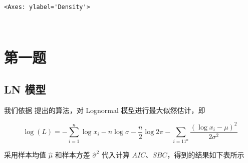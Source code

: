 \documentclass[11pt]{article}
\makeatletter
\newcommand{\boxspacing}{\kern\kvtcb@left@rule\kern\kvtcb@boxsep}
\newcommand{\prompt}[4]{
        {\ttfamily\llap{{\color{#2}[#3]:\hspace{3pt}#4}}\vspace{-\baselineskip}}
    }
\makeatother
\begin{document}
            \begin{tcolorbox}[breakable, size=fbox, boxrule=.5pt, pad at break*=1mm, opacityfill=0]
\prompt{Out}{outcolor}{48}{\boxspacing}
\begin{Verbatim}[commandchars=\\\{\}]
<Axes: ylabel='Density'>
\end{Verbatim}
\end{tcolorbox}

    \begin{center}
    \end{center}
    { \hspace*{\fill} \\}

    \hypertarget{ux7b2cux4e00ux9898}{%
\section{第一题}\label{ux7b2cux4e00ux9898}}

\hypertarget{ln-ux6a21ux578b}{%
\subsection{LN 模型}\label{ln-ux6a21ux578b}}

我们依据\cite{wang2020corrected} 提出的算法，对 Lognormal
模型进行最大似然估计，即

\[
\log(L) = -\sum_{i=1}^n\log x_i-n\log\sigma-\frac{n}{2}\log 2\pi - \sum_{i=11^n}\frac{(\log x_i-\mu)^2}{2\sigma^2}
\]

采用样本均值 \(\hat\mu\) 和样本方差 \(\hat\sigma^2\) 代入计算
\(AIC\)、\(SBC\)，得到的结果如下表所示
\end{document}
